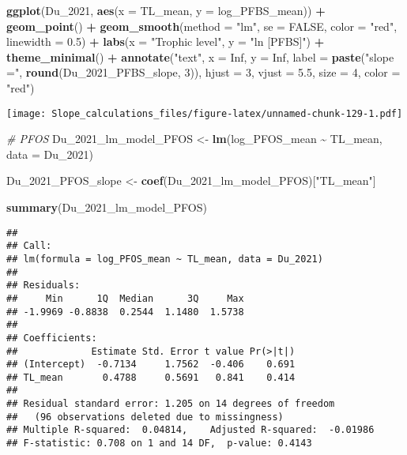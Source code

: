 \documentclass[
]{article}
\newenvironment{Shaded}{\begin{snugshade}}{\end{snugshade}}
\newcommand{\AttributeTok}[1]{\textcolor[rgb]{0.13,0.29,0.53}{#1}}
\newcommand{\CommentTok}[1]{\textcolor[rgb]{0.56,0.35,0.01}{\textit{#1}}}
\newcommand{\ConstantTok}[1]{\textcolor[rgb]{0.56,0.35,0.01}{#1}}
\newcommand{\DecValTok}[1]{\textcolor[rgb]{0.00,0.00,0.81}{#1}}
\newcommand{\FloatTok}[1]{\textcolor[rgb]{0.00,0.00,0.81}{#1}}
\newcommand{\FunctionTok}[1]{\textcolor[rgb]{0.13,0.29,0.53}{\textbf{#1}}}
\newcommand{\NormalTok}[1]{#1}
\newcommand{\OtherTok}[1]{\textcolor[rgb]{0.56,0.35,0.01}{#1}}
\newcommand{\SpecialCharTok}[1]{\textcolor[rgb]{0.81,0.36,0.00}{\textbf{#1}}}
\newcommand{\StringTok}[1]{\textcolor[rgb]{0.31,0.60,0.02}{#1}}
\begin{document}
\begin{Shaded}
\begin{Highlighting}[]
\FunctionTok{ggplot}\NormalTok{(Du\_2021, }\FunctionTok{aes}\NormalTok{(}\AttributeTok{x =}\NormalTok{ TL\_mean, }\AttributeTok{y =}\NormalTok{ log\_PFBS\_mean)) }\SpecialCharTok{+}
  \FunctionTok{geom\_point}\NormalTok{() }\SpecialCharTok{+}
  \FunctionTok{geom\_smooth}\NormalTok{(}\AttributeTok{method =} \StringTok{"lm"}\NormalTok{, }\AttributeTok{se =} \ConstantTok{FALSE}\NormalTok{, }\AttributeTok{color =} \StringTok{"red"}\NormalTok{, }\AttributeTok{linewidth =} \FloatTok{0.5}\NormalTok{) }\SpecialCharTok{+}
  \FunctionTok{labs}\NormalTok{(}\AttributeTok{x =} \StringTok{"Trophic level"}\NormalTok{,}
       \AttributeTok{y =} \StringTok{"ln [PFBS]"}\NormalTok{) }\SpecialCharTok{+}
  \FunctionTok{theme\_minimal}\NormalTok{() }\SpecialCharTok{+}
  \FunctionTok{annotate}\NormalTok{(}\StringTok{"text"}\NormalTok{, }\AttributeTok{x =} \ConstantTok{Inf}\NormalTok{, }\AttributeTok{y =} \ConstantTok{Inf}\NormalTok{, }\AttributeTok{label =} \FunctionTok{paste}\NormalTok{(}\StringTok{"slope ="}\NormalTok{, }\FunctionTok{round}\NormalTok{(Du\_2021\_PFBS\_slope, }\DecValTok{3}\NormalTok{)), }
           \AttributeTok{hjust =} \DecValTok{3}\NormalTok{, }\AttributeTok{vjust =} \FloatTok{5.5}\NormalTok{, }\AttributeTok{size =} \DecValTok{4}\NormalTok{, }\AttributeTok{color =} \StringTok{"red"}\NormalTok{)}
\end{Highlighting}
\end{Shaded}

\texttt{[image: Slope\_calculations\_files/figure-latex/unnamed-chunk-129-1.pdf]}

\begin{Shaded}
\begin{Highlighting}[]
\CommentTok{\# PFOS}
\NormalTok{Du\_2021\_lm\_model\_PFOS }\OtherTok{\textless{}{-}} \FunctionTok{lm}\NormalTok{(log\_PFOS\_mean }\SpecialCharTok{\textasciitilde{}}\NormalTok{ TL\_mean,}
                             \AttributeTok{data =}\NormalTok{ Du\_2021)}

\NormalTok{Du\_2021\_PFOS\_slope }\OtherTok{\textless{}{-}} \FunctionTok{coef}\NormalTok{(Du\_2021\_lm\_model\_PFOS)[}\StringTok{"TL\_mean"}\NormalTok{]}

\FunctionTok{summary}\NormalTok{(Du\_2021\_lm\_model\_PFOS)}
\end{Highlighting}
\end{Shaded}

\begin{verbatim}
## 
## Call:
## lm(formula = log_PFOS_mean ~ TL_mean, data = Du_2021)
## 
## Residuals:
##     Min      1Q  Median      3Q     Max 
## -1.9969 -0.8838  0.2544  1.1480  1.5738 
## 
## Coefficients:
##             Estimate Std. Error t value Pr(>|t|)
## (Intercept)  -0.7134     1.7562  -0.406    0.691
## TL_mean       0.4788     0.5691   0.841    0.414
## 
## Residual standard error: 1.205 on 14 degrees of freedom
##   (96 observations deleted due to missingness)
## Multiple R-squared:  0.04814,    Adjusted R-squared:  -0.01986 
## F-statistic: 0.708 on 1 and 14 DF,  p-value: 0.4143
\end{verbatim}
\end{document}

